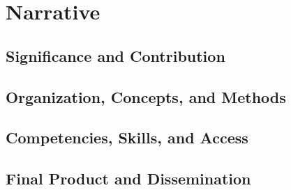 \documentclass{neh}
\begin{document}
\section{Narrative}
\subsection{Significance and Contribution}

\subsection{Organization, Concepts, and Methods}

\subsection{Competencies, Skills, and Access}

\subsection{Final Product and Dissemination}
\end{document}
